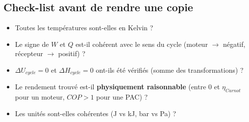 \subsection{Check-list avant de rendre une copie}
\begin{itemize}[leftmargin=1.4em]
\item Toutes les températures sont-elles en Kelvin ?
\item Le signe de $W$ et $Q$ est-il cohérent avec le sens du cycle (moteur $\to$ négatif, récepteur $\to$
positif) ?
\item $\Delta U_{cycle}=0$ et $\Delta H_{cycle}=0$ ont-ils été vérifiés (somme des transformations) ?
\item Le rendement trouvé est-il \textbf{physiquement raisonnable} (entre 0 et $\eta_{Carnot}$ pour un moteur,
$COP>1$ pour une PAC) ?
\item Les unités sont-elles cohérentes (J vs kJ, bar vs Pa) ?
\end{itemize}
